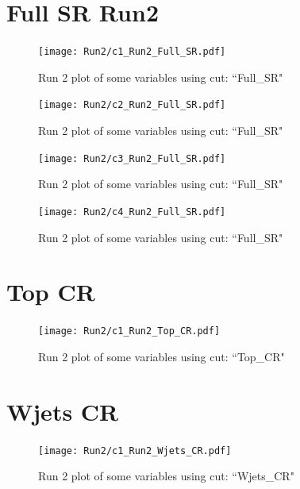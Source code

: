 \documentclass{article}
\begin{document}
    \section*{Full SR Run2}
    \begin{figure}[H]
        \centering
        \caption{Run 2 plot of some variables using cut: ``Full\_SR"}
        \texttt{[image: Run2/c1\_Run2\_Full\_SR.pdf]}
    \end{figure}
    \begin{figure}[H]
        \centering
        \caption{Run 2 plot of some variables using cut: ``Full\_SR"}
        \texttt{[image: Run2/c2\_Run2\_Full\_SR.pdf]}
    \end{figure}
    \begin{figure}[H]
        \centering
        \caption{Run 2 plot of some variables using cut: ``Full\_SR"}
        \texttt{[image: Run2/c3\_Run2\_Full\_SR.pdf]}
    \end{figure}
    \begin{figure}[H]
        \centering
        \caption{Run 2 plot of some variables using cut: ``Full\_SR"}
        \texttt{[image: Run2/c4\_Run2\_Full\_SR.pdf]}
    \end{figure}
    \section*{Top CR}
    \begin{figure}[H]
        \centering
        \caption{Run 2 plot of some variables using cut: ``Top\_CR"}
        \texttt{[image: Run2/c1\_Run2\_Top\_CR.pdf]}
    \end{figure}  
    \section*{Wjets CR}
    \begin{figure}[H]
        \centering
        \caption{Run 2 plot of some variables using cut: ``Wjets\_CR"}
        \texttt{[image: Run2/c1\_Run2\_Wjets\_CR.pdf]}
    \end{figure}  
\end{document}
